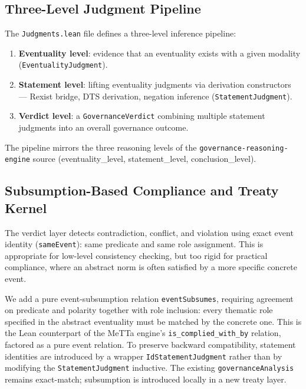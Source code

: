 \documentclass[]{article}
\newcommand{\code}[1]{\texttt{#1}}
\begin{document}
\subsection{Three-Level Judgment Pipeline}

The \code{Judgments.lean} file defines a three-level inference pipeline:

\begin{enumerate}
\item \textbf{Eventuality level}: evidence that an eventuality exists with
      a given modality (\code{EventualityJudgment}).
\item \textbf{Statement level}: lifting eventuality judgments via derivation
      constructors --- Rexist bridge, DTS derivation, negation inference
      (\code{StatementJudgment}).
\item \textbf{Verdict level}: a \code{GovernanceVerdict} combining multiple
      statement judgments into an overall governance outcome.
\end{enumerate}

\noindent
The pipeline mirrors the three reasoning levels of the
\code{governance-reasoning-engine} source \cite{GovReasoningEngine}
(eventuality\_level, statement\_level, conclusion\_level).

\subsection{Subsumption-Based Compliance and Treaty Kernel}

The verdict layer detects contradiction, conflict, and violation using exact
event identity (\code{sameEvent}): same predicate and same role assignment.
This is appropriate for low-level consistency checking, but too rigid for
practical compliance, where an abstract norm is often satisfied by a more
specific concrete event.

We add a pure event-subsumption relation \code{eventSubsumes}, requiring
agreement on predicate and polarity together with role inclusion: every
thematic role specified in the abstract eventuality must be matched by the
concrete one.  This is the Lean counterpart of the MeTTa engine's
\code{is\_complied\_with\_by} relation, factored as a pure event relation.
To preserve backward compatibility, statement identities are introduced by a
wrapper \code{IdStatementJudgment} rather than by modifying the
\code{StatementJudgment} inductive.  The existing \code{governanceAnalysis}
remains exact-match; subsumption is introduced locally in a new treaty layer.
\end{document}
